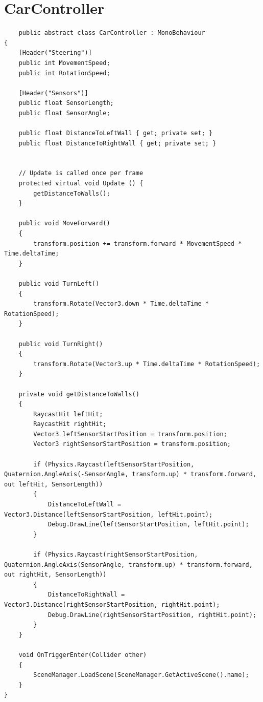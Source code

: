 \documentclass[12pt,a4paper]{article}
\begin{document}
	\section*{CarController}
	\begin{lstlisting}
	public abstract class CarController : MonoBehaviour
{
    [Header("Steering")]
    public int MovementSpeed;
    public int RotationSpeed;

    [Header("Sensors")]
    public float SensorLength;
    public float SensorAngle;

    public float DistanceToLeftWall { get; private set; }
    public float DistanceToRightWall { get; private set; }

	
	// Update is called once per frame
	protected virtual void Update () {
        getDistanceToWalls();
    }

    public void MoveForward()
    {
        transform.position += transform.forward * MovementSpeed * Time.deltaTime;
    }

    public void TurnLeft()
    {
        transform.Rotate(Vector3.down * Time.deltaTime * RotationSpeed);
    }

    public void TurnRight()
    {
        transform.Rotate(Vector3.up * Time.deltaTime * RotationSpeed);
    }

    private void getDistanceToWalls()
    {
        RaycastHit leftHit;
        RaycastHit rightHit;
        Vector3 leftSensorStartPosition = transform.position;
        Vector3 rightSensorStartPosition = transform.position;

        if (Physics.Raycast(leftSensorStartPosition, Quaternion.AngleAxis(-SensorAngle, transform.up) * transform.forward, out leftHit, SensorLength))
        {
            DistanceToLeftWall = Vector3.Distance(leftSensorStartPosition, leftHit.point);
            Debug.DrawLine(leftSensorStartPosition, leftHit.point);
        }

        if (Physics.Raycast(rightSensorStartPosition, Quaternion.AngleAxis(SensorAngle, transform.up) * transform.forward, out rightHit, SensorLength))
        {
            DistanceToRightWall = Vector3.Distance(rightSensorStartPosition, rightHit.point);
            Debug.DrawLine(rightSensorStartPosition, rightHit.point);
        }
    }

    void OnTriggerEnter(Collider other)
    {
        SceneManager.LoadScene(SceneManager.GetActiveScene().name);
    }
}
	\end{lstlisting}
	
\end{document}
